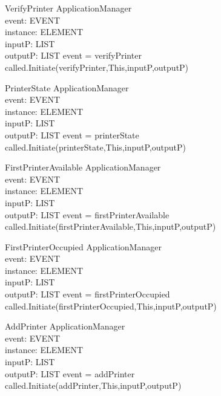 \begin{schema}{VerifyPrinter}
\Delta ApplicationManager \\
event: EVENT \\
instance: ELEMENT \\
inputP: LIST \\
outputP: LIST
\where event = verifyPrinter \\
called.Initiate(verifyPrinter,This,inputP,outputP)
\end{schema}

\begin{schema}{PrinterState}
\Delta ApplicationManager \\
event: EVENT \\
instance: ELEMENT \\
inputP: LIST \\
outputP: LIST
\where event = printerState \\
called.Initiate(printerState,This,inputP,outputP)
\end{schema}

\begin{schema}{FirstPrinterAvailable}
\Delta ApplicationManager \\
event: EVENT \\
instance: ELEMENT \\
inputP: LIST \\
outputP: LIST
\where event = firstPrinterAvailable \\
called.Initiate(firstPrinterAvailable,This,inputP,outputP)
\end{schema}

\begin{schema}{FirstPrinterOccupied}
\Delta ApplicationManager \\
event: EVENT \\
instance: ELEMENT \\
inputP: LIST \\
outputP: LIST
\where event = firstPrinterOccupied \\
called.Initiate(firstPrinterOccupied,This,inputP,outputP)
\end{schema}

\begin{schema}{AddPrinter}
\Delta ApplicationManager \\
event: EVENT \\
instance: ELEMENT \\
inputP: LIST \\
outputP: LIST
\where event = addPrinter \\
called.Initiate(addPrinter,This,inputP,outputP)
\end{schema}

